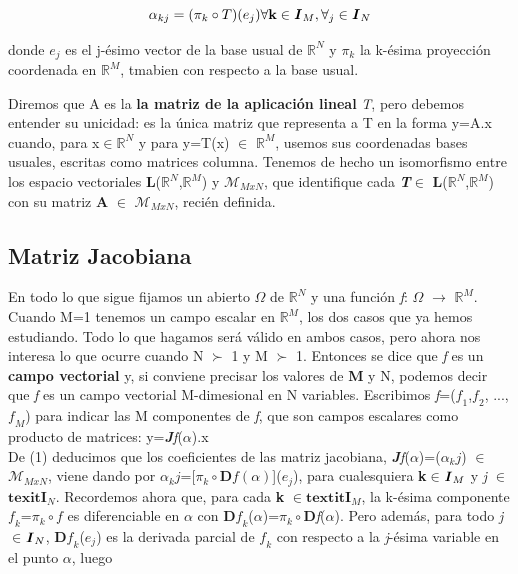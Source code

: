 \documentclass[letter,openrigh,12pt,spanish]{report}
\begin{document}
\begin{displaymath}
\alpha_{kj}=(\pi_k \circ T)(e_j) 	\forall \textbf{k}\in\textbf{\textit{I}}_M, \forall_j\in\textbf{\textit{I}}_N
\end{displaymath}

donde $e_j$ es el j-\'esimo vector de la base usual de $\mathbb{R}^N$ y $\pi_k$ la k-\'esima proyecci\'on coordenada en $\mathbb{R}^M$, tmabien con respecto a la base usual.

Diremos que A es la \textbf{la matriz de la aplicaci\'on lineal} \textit{T}, pero debemos entender su unicidad: es la \'unica matriz que representa a T en la forma y=A.x cuando, para x$\in$$\mathbb{R}^N$ y para y=T(x) $\in$ $\mathbb{R}^M$, usemos sus coordenadas bases usuales, escritas como matrices columna. Tenemos de hecho un isomorfismo entre los espacio vectoriales \textbf{L}($\mathbb{R}^N$,$\mathbb{R}^M$) y $\mathcal{M}_{MxN}$, que identifique cada \textbf{\textit{T}}$\in$ \textbf{L}($\mathbb{R}^N$,$\mathbb{R}^M$) con su matriz \textbf{A} $\in$ $\mathcal{M}_{MxN}$, reci\'en definida.

\subsection{Matriz Jacobiana}

En todo lo que sigue fijamos un abierto $\Omega$ de $\mathbb{R}^N$ y una funci\'on \textit{f}: $\Omega$ $\longrightarrow$ $\mathbb{R}^M$. Cuando M=1 tenemos un campo escalar en $\mathbb{R}^M$, los dos casos que ya hemos estudiando. Todo lo que hagamos ser\'a v\'alido en ambos casos, pero ahora nos interesa lo que ocurre cuando N $\succ$ 1 y M $\succ$ 1. Entonces se dice que \textit{f} es un \textbf{campo vectorial} y, si conviene precisar los valores de \textbf{M} y N, podemos decir que \textit{f} es un campo vectorial M-dimesional en N variables. Escribimos \textit{f}=($\textit{f}_1$,$\textit{f}_2$, ..., $\textit{f}_M$) para indicar las M componentes de \textit{f}, que son campos escalares como producto de matrices: y=\textbf{\textit{J}}\textit{f}(\textbf{$\alpha$}).x\\
De (1) deducimos que los coeficientes de las matriz jacobiana, \textbf{\textit{J}}\textit{f}($\alpha$)=($\alpha_kj$) $\in$ $\mathcal{M}_{MxN}$, viene dando por $\alpha_kj$=[$\pi_k\circ \textbf{D}\textit{f}(\alpha)$]($e_j$), para cualesquiera \textbf{k}$\in$$\textbf{\textit{I}}_M$ y \textit{j} $\in$$\textbf{texit{I}}_N$. Recordemos ahora que, para cada \textbf{k} $\in$$\textbf{textit{I}}_M$, la k-\'esima componente $\textit{f}_k$=$\pi
_k\circ \textit{f}$ es diferenciable en $\alpha$ con \textbf{D$\textit{f}_k$}($\alpha$)=$\pi_k\circ$\textbf{D}\textit{f}($\alpha$). Pero adem\'as, para todo \textit{j}$\in$$\textbf{\textit{I}}_N$, \textbf{D}$\textit{f}_k$($e_j$) es la derivada parcial de $\textit{f}_k$ con respecto a la \textit{j}-\'esima variable en el punto $\alpha$, luego
\end{document}
